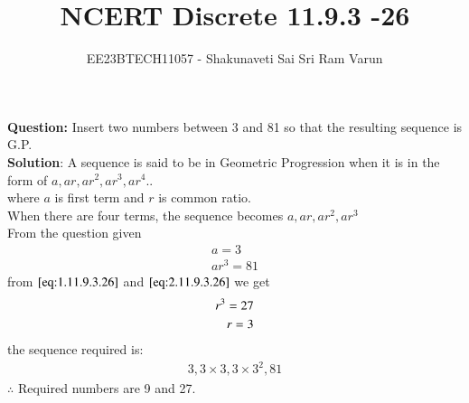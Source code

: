 \documentclass[journal,12pt,twocolumn]{IEEEtran}
\theoremstyle{remark}
\begin{document}

\vspace{3cm}

\title{NCERT Discrete 11.9.3 -26}
\author{EE23BTECH11057 - Shakunaveti Sai Sri Ram Varun$^{}$%
}
\maketitle
\newpage
\bigskip

\renewcommand{\thefigure}{\theenumi}
\renewcommand{\thetable}{\theenumi}
\vspace{2cm}
\textbf{Question: }
Insert two numbers between 3 and 81 so that the resulting sequence is G.P.\\
\textbf{Solution}:
A sequence is said to be in Geometric Progression when it is in the form of $ a, ar, ar^2, ar^3, ar^4..$\\
where $a$ is first term and $r$ is common ratio.\\
When there are four terms, the sequence becomes $ a, ar, ar^2, ar^3$\\
From the question given
\begin{align}
a = 3 \label{eq:1.11.9.3.26}\\
ar^3 = 81 \label{eq:2.11.9.3.26}
\end{align}
from $ \eqref{eq:1.11.9.3.26}$ and $ \eqref{eq:2.11.9.3.26}$ we get
\begin{align}
\notag r^3 = 27 \\
\notag r = 3
\end{align}
the sequence required is:
\begin{align}
3, 3 \times 3, 3 \times 3^2, 81
\end{align}
$ \therefore $ Required numbers are 9 and 27.
\end{document}
